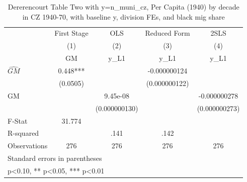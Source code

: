 \begin{table}[htbp]\centering
\def\sym#1{\ifmmode^{#1}\else\(^{#1}\)\fi}
\caption{Dererencourt Table Two with y=n\_muni\_cz, Per Capita (1940) by decade in CZ 1940-70, with baseline y, division FEs, and black mig share}
\begin{tabular}{l*{4}{c}}
\toprule
                    & First Stage   &         OLS   &Reduced Form   &        2SLS   \\
                    &\multicolumn{1}{c}{(1)}&\multicolumn{1}{c}{(2)}&\multicolumn{1}{c}{(3)}&\multicolumn{1}{c}{(4)}\\
                    &\multicolumn{1}{c}{GM}&\multicolumn{1}{c}{y\_L1}&\multicolumn{1}{c}{y\_L1}&\multicolumn{1}{c}{y\_L1}\\
\midrule
$\hat{GM}$          &       0.448***&               &-0.000000124   &               \\
                    &    (0.0505)   &               &(0.000000122)   &               \\
\addlinespace
GM                  &               &    9.45e-08   &               &-0.000000278   \\
                    &               &(0.000000130)   &               &(0.000000273)   \\
\midrule
F-Stat              &      31.774   &               &               &               \\
R-squared           &               &        .141   &        .142   &               \\
Observations        &         276   &         276   &         276   &         276   \\
\bottomrule
\multicolumn{5}{l}{\footnotesize Standard errors in parentheses}\\
\multicolumn{5}{l}{\footnotesize * p<0.10, ** p<0.05, *** p<0.01}\\
\end{tabular}
\end{table}
